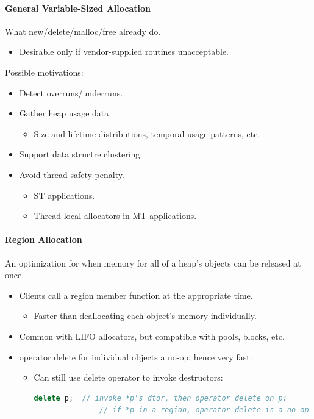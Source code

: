 \paragraph{General Variable-Sized Allocation}
What new/delete/malloc/free already do.
\begin{itemize}
  \item Desirable only if vendor-supplied routines unacceptable.
\end{itemize}
Possible motivations:
\begin{itemize}
  \item Detect overruns/underruns.
  \item Gather heap usage data.
  \begin{itemize}
    \item Size and lifetime distributions, temporal usage patterns, etc.
  \end{itemize}
  \item Support data structre clustering.
  \item Avoid thread-safety penalty.
  \begin{itemize}
    \item ST applications.
    \item Thread-local allocators in MT applications.
  \end{itemize}
\end{itemize}

\paragraph{Region Allocation}
An optimization for when memory for all of a heap's objects can be released at once.
\begin{itemize}
  \item Clients call a region member function at the appropriate time.
  \begin{itemize}
    \item Faster than deallocating each object's memory individually.
  \end{itemize}
  \item Common with LIFO allocators, but compatible with pools, blocks, etc.
  \item operator delete for individual objects a no-op, hence very fast.
  \begin{itemize}
    \item Can still use delete operator to invoke destructors:\\
    \begin{lstlisting}[language=C++]
    delete p;  // invoke *p's dtor, then operator delete on p;
               // if *p in a region, operator delete is a no-op
    \end{lstlisting}
  \end{itemize}
\end{itemize}


